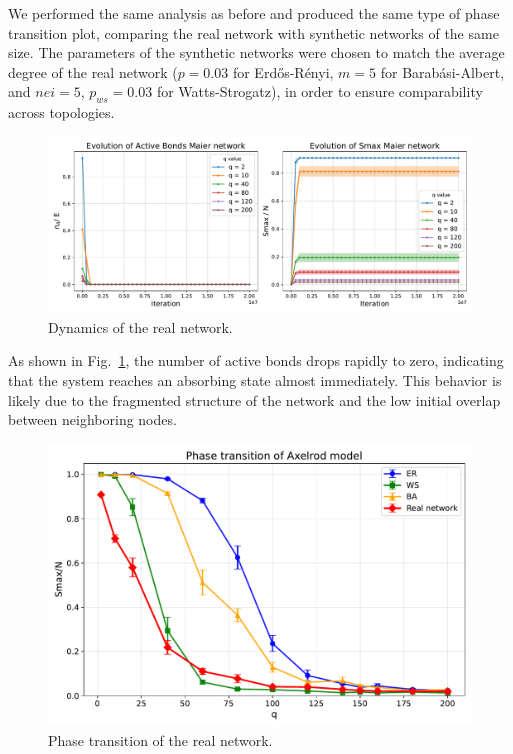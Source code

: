 We performed the same analysis as before and produced the same type of phase transition plot, comparing the real network with synthetic networks of the same size. The parameters of the synthetic networks were chosen to match the average degree of the real network ($p = 0.03$ for Erdős-Rényi, $m = 5$ for Barabási-Albert, and $nei = 5$, $p_{ws} = 0.03$ for Watts-Strogatz), in order to ensure comparability across topologies.

\begin{figure}[hbtp]
    \centering
    \includegraphics[width=0.9\linewidth]{figures/task30_plots/evolution_plot_maier.pdf}
    \caption{Dynamics of the real network.}
    \label{fig:Maier_dynamics}
\end{figure}

As shown in Fig.~\ref{fig:Maier_dynamics}, the number of active bonds drops rapidly to zero, indicating that the system reaches an absorbing state almost immediately. This behavior is likely due to the fragmented structure of the network and the low initial overlap between neighboring nodes.

\begin{figure}[hbtp]
    \centering
    \includegraphics[width=0.75\linewidth]{figures/task30_plots/real_network.pdf}
    \caption{Phase transition of the real network.}
    \label{fig:transition_real}
\end{figure}

